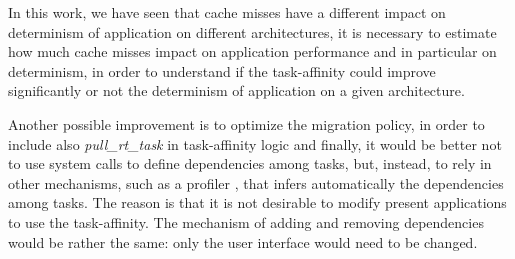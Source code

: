 In this work, we have seen that cache misses have a different impact on determinism of application on different architectures, it is necessary to 
estimate how much cache misses impact on application performance and in particular on determinism, in order to understand if the task-affinity could 
improve significantly or not the determinism of application on a given architecture. 

Another possible improvement is to optimize the migration policy, in order to include also \textit{pull\_rt\_task} in task-affinity logic and finally, it 
would be better not to use system calls to define dependencies among tasks, but, instead, to rely in other mechanisms, such as a profiler \cite{calandro}, 
that infers automatically the dependencies among tasks. The reason is that it is not desirable to modify present applications to use the task-affinity. 
The mechanism of adding and removing dependencies would be rather the same: only the user interface would need to be changed.

